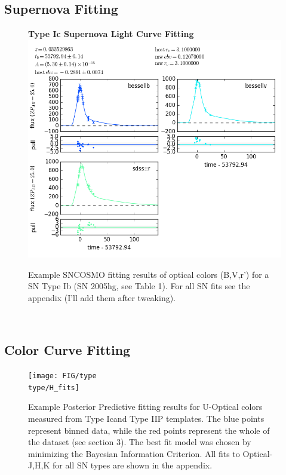 %
\subsection{Supernova Fitting}
\begin{figure}[H]
\centering
\textbf{Type Ic Supernova Light Curve Fitting}
\includegraphics[scale=.75,center]{FIG/fits/lc_2006aj}
\caption{\label{fig:FIG/typeIb/J_fits} Example SNCOSMO fitting results of optical colors (B,V,r') for a SN Type Ib (SN 2005hg, see Table 1). For all SN fits see the appendix (I'll add them after tweaking).}
\end{figure}

\

\subsection{Color Curve Fitting}
\newcommand{\type}{Ic}
\begin{figure}[H]
\centering
\texttt{[image: FIG/type\\type/H\_fits]}
\caption{\label{fig:FIG/typeIb/H_fits} Example Posterior Predictive fitting results for U-Optical colors measured from Type \type and Type IIP templates. The blue points represent binned data, while the red points represent the whole of the dataset (see section 3). The best fit model was chosen by minimizing the Bayesian Information Criterion. All fits to Optical-J,H,K for all SN types are shown in the appendix.}
\end{figure}

